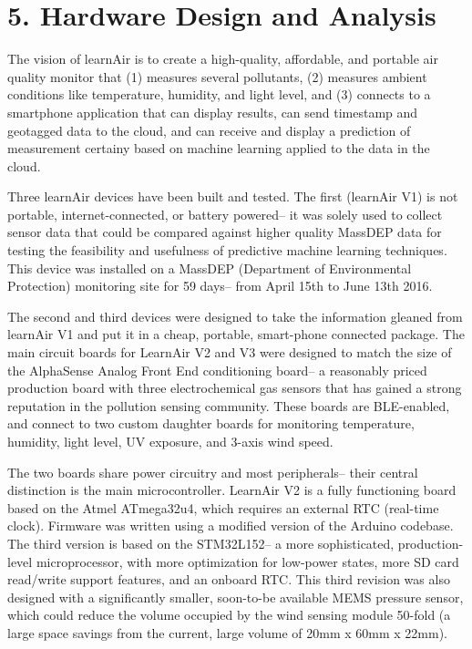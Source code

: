 \chapter{5. Hardware Design and Analysis}

The vision of learnAir is to create a high-quality, affordable, and portable air quality monitor that (1) measures several pollutants, (2) measures ambient conditions like temperature, humidity, and light level, and (3) connects to a smartphone application that can display results, can send timestamp and geotagged data to the cloud, and can receive and display a prediction of measurement certainy based on machine learning applied to the data in the cloud.

Three learnAir devices have been built and tested.  The first (learnAir V1) is not portable, internet-connected, or battery powered-- it was solely used to collect sensor data that could be compared against higher quality MassDEP data for testing the feasibility and usefulness of predictive machine learning techniques.  This device was installed on a MassDEP (Department of Environmental Protection) monitoring site for 59 days-- from April 15th to June 13th 2016.

The second and third devices were designed to take the information gleaned from learnAir V1 and put it in a cheap, portable, smart-phone connected package.  The main circuit boards for LearnAir V2 and V3 were designed to match the size of the AlphaSense Analog Front End conditioning board-- a reasonably priced production board with three electrochemical gas sensors that has gained a strong reputation in the pollution sensing community.  These boards are BLE-enabled, and connect to two custom daughter boards for monitoring temperature, humidity, light level, UV exposure, and 3-axis wind speed.   

The two boards share power circuitry and most peripherals-- their central distinction is the main microcontroller.  LearnAir V2 is a fully functioning board based on the Atmel ATmega32u4, which requires an external RTC (real-time clock).  Firmware was written using a modified version of the Arduino codebase.  The third version is based on the STM32L152-- a more sophisticated, production-level microprocessor, with more optimization for low-power states, more SD card read/write support features, and an onboard RTC.  This third revision was also designed with a significantly smaller, soon-to-be available MEMS pressure sensor, which could reduce the volume occupied by the wind sensing module 50-fold (a large space savings from the current, large volume of 20mm x 60mm x 22mm).
     
